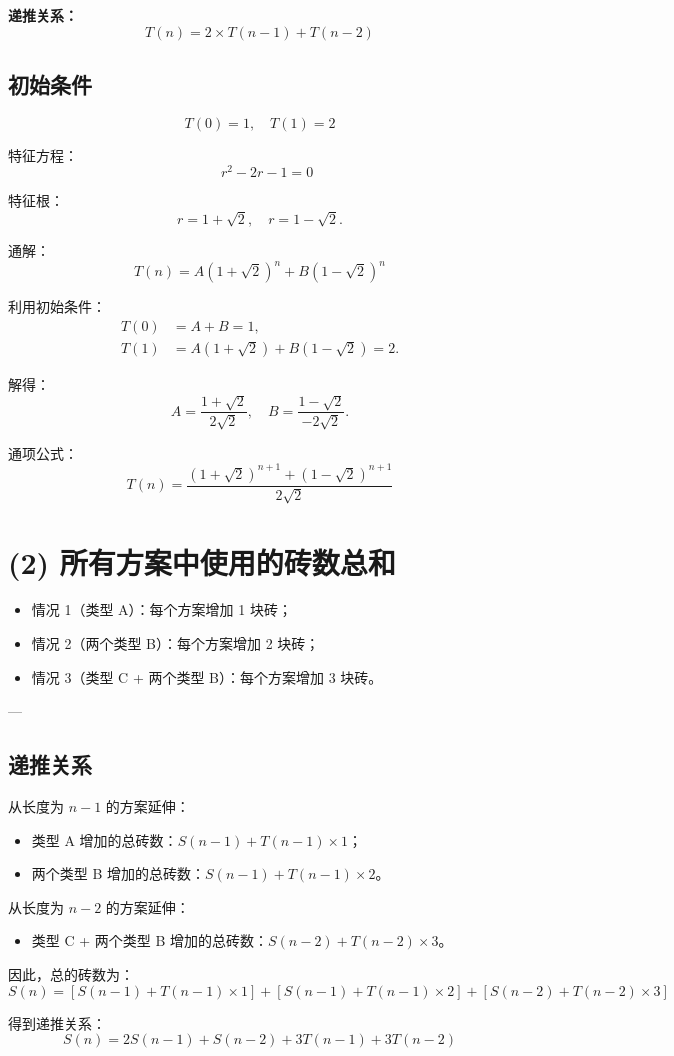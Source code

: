 \documentclass{article}
\begin{document}
\textbf{递推关系：}
\[
T(n) = 2 \times T(n-1) + T(n-2)
\]

\subsection*{初始条件}
\[
T(0) = 1, \quad T(1) = 2
\]

特征方程：
\[
\quad r^2 - 2r - 1 = 0
\]

特征根：
\[
r = 1 + \sqrt{2}, \quad r = 1 - \sqrt{2}.
\]

通解：
\[
T(n) = A (1 + \sqrt{2})^n + B (1 - \sqrt{2})^n
\]

利用初始条件：
\begin{align*}
T(0) &= A + B = 1, \\
T(1) &= A (1 + \sqrt{2}) + B (1 - \sqrt{2}) = 2.
\end{align*}

解得：
\[
A = \frac{1 + \sqrt{2}}{2 \sqrt{2}}, \quad B = \frac{1 - \sqrt{2}}{-2 \sqrt{2}}.
\]

通项公式：
\[
\boxed{T(n) = \frac{(1 + \sqrt{2})^{n+1} + (1 - \sqrt{2})^{n+1}}{2 \sqrt{2}}}
\]

\section*{(2) 所有方案中使用的砖数总和}

\begin{itemize}
    \item 情况 1（类型 A）：每个方案增加 1 块砖；
    \item 情况 2（两个类型 B）：每个方案增加 2 块砖；
    \item 情况 3（类型 C + 两个类型 B）：每个方案增加 3 块砖。
\end{itemize}

---

\subsection*{递推关系}

从长度为 $n-1$ 的方案延伸：
\begin{itemize}
    \item 类型 A 增加的总砖数：$S(n-1) + T(n-1) \times 1$；
    \item 两个类型 B 增加的总砖数：$S(n-1) + T(n-1) \times 2$。
\end{itemize}

从长度为 $n-2$ 的方案延伸：
\begin{itemize}
    \item 类型 C + 两个类型 B 增加的总砖数：$S(n-2) + T(n-2) \times 3$。
\end{itemize}

因此，总的砖数为：
\[
S(n) = [S(n-1) + T(n-1) \times 1] + [S(n-1) + T(n-1) \times 2] + [S(n-2) + T(n-2) \times 3]
\]

得到递推关系：
\[
\boxed{S(n) = 2S(n-1) + S(n-2) + 3T(n-1) + 3T(n-2)}
\]
\end{document}

